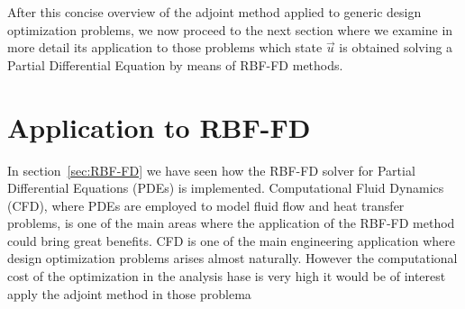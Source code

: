After this concise overview of the adjoint method applied to generic design optimization problems, we now proceed to the next section where we examine in more detail its application to those problems which state $\vec{u}$ is obtained solving a Partial Differential Equation by means of RBF-FD methods.



\section{Application to RBF-FD}

In section~\ref{sec:RBF-FD} we have seen how the RBF-FD solver for Partial Differential Equations (PDEs) is implemented. Computational Fluid Dynamics (CFD), where PDEs are employed to model fluid flow and heat transfer problems, is one of the main areas where the application of the RBF-FD method could bring great benefits.
CFD is one of the main engineering application where design optimization problems arises almost naturally. However the computational cost of the optimization in the analysis hase is very high it would be of interest apply the adjoint method in those problema


